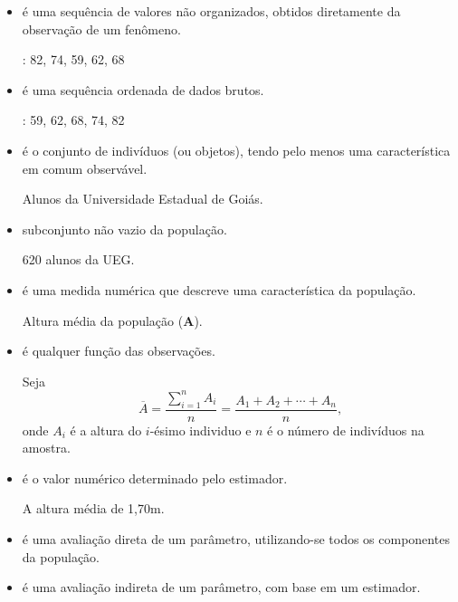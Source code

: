 \documentclass[11pt,fleqn]{book}
\numberwithin{mpicture}{chapter}
\numberwithin{mtable}{chapter}
\numberwithin{mframe}{chapter}
\begin{document}
\begin{itemize}
	\item {} é uma sequência de valores não organizados, obtidos diretamente da observação de um fenômeno.	
	\begin{example}\hfill
	
		: 82, 74, 59, 62, 68
	\end{example}
		
	\item {} é uma sequência ordenada de dados brutos.
	\begin{example}\hfill
	
		: 59, 62, 68, 74, 82
	\end{example}
		
	\item {} é o conjunto de indivíduos (ou objetos), tendo pelo menos uma característica em comum observável.
	\begin{example}\hfill
		
		Alunos da Universidade Estadual de Goiás.
	\end{example}
		
	\item {} subconjunto não vazio da população.
	\begin{example}\hfill
	
		620 alunos da UEG.
	\end{example}
		
	\item {} é uma medida numérica que descreve uma característica da população.
	\begin{example}\hfill
		
		Altura média da população (\textbf{A}).
	\end{example}
		
	\item {} é qualquer função das observações.
	\begin{example}\hfill
	
		Seja
		\[
			\overline{A}=\frac{\displaystyle\sum_{i=1}^n A_i}{n}=\frac{A_1+A_2+\cdots+A_n}{n}\text{,}
		\]
		onde $A_i$ é a altura do $i$-ésimo individuo e $n$ é o número de indivíduos na amostra.
	\end{example}
	
	\item {} é o valor numérico determinado pelo estimador.
	\begin{example}\hfill
	
		A altura média de 1,70m.
	\end{example}
		
	\item {} é uma avaliação direta de um parâmetro, utilizando-se todos os componentes da população.
		
	\item {} é uma avaliação indireta de um parâmetro, com base em um estimador.
\end{itemize}
\end{document}
